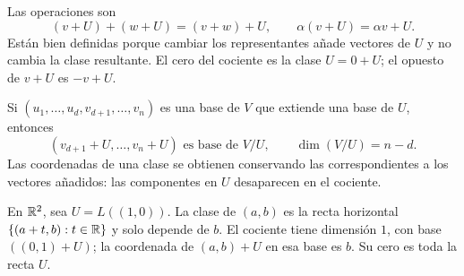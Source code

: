 Las operaciones son
\[
 (v+U)+(w+U)=(v+w)+U,\qquad \alpha(v+U)=\alpha v+U.
\]
Están bien definidas porque cambiar los representantes añade vectores
de $U$ y no cambia la clase resultante. El cero del cociente es la clase
$U=0+U$; el opuesto de $v+U$ es $-v+U$.

Si $(u_1,\ldots,u_d,v_{d+1},\ldots,v_n)$ es una base de $V$ que extiende
una base de $U$, entonces
\[
 (v_{d+1}+U,\ldots,v_n+U)\text{ es base de }V/U,
 \qquad \dim(V/U)=n-d.
\]
Las coordenadas de una clase se obtienen conservando las correspondientes
a los vectores añadidos: las componentes en $U$ desaparecen en el cociente.

\begin{ejemplo}
En $\mathbb{R}^2$, sea $U=L((1,0))$. La clase de $(a,b)$ es la recta horizontal
$\{(a+t,b):t\in\mathbb{R}\}$ y solo depende de $b$.
El cociente tiene dimensión $1$, con base $((0,1)+U)$; la coordenada
de $(a,b)+U$ en esa base es $b$. Su cero es toda la recta $U$.
\end{ejemplo}
